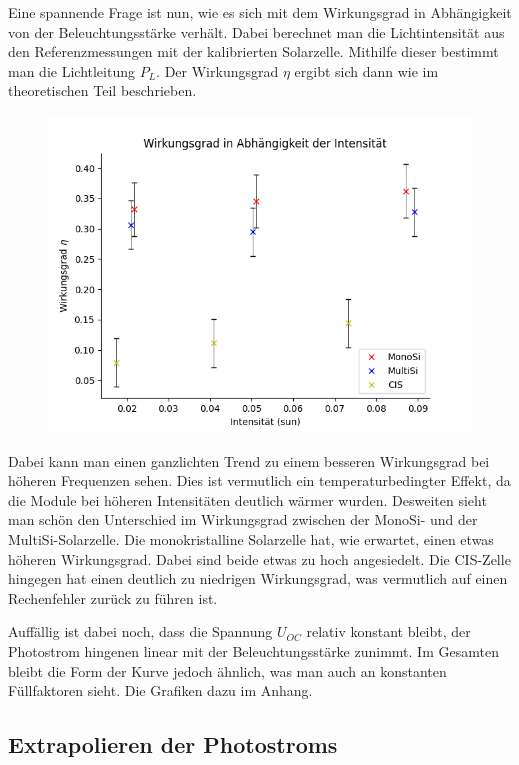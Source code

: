 Eine spannende Frage ist nun, wie es sich mit dem Wirkungsgrad in Abhängigkeit von der Beleuchtungsstärke verhält. 
Dabei berechnet man die Lichtintensität aus den Referenzmessungen mit der kalibrierten Solarzelle. Mithilfe dieser 
bestimmt man die Lichtleitung $P_L$. Der Wirkungsgrad $\eta$ ergibt sich dann wie im theoretischen Teil beschrieben. 

\begin{figure}[h]
    \centering
    \includegraphics[width = \linewidth]{Bilder/PlotWirkungsgradInt.png}
\end{figure}

Dabei kann man einen ganzlichten Trend zu einem besseren Wirkungsgrad bei höheren Frequenzen sehen. Dies ist vermutlich ein 
temperaturbedingter Effekt, da die Module bei höheren Intensitäten deutlich wärmer wurden. Desweiten sieht man schön den Unterschied 
im Wirkungsgrad zwischen der MonoSi- und der MultiSi-Solarzelle. Die monokristalline Solarzelle hat, wie erwartet, einen etwas höheren 
Wirkungsgrad. Dabei sind beide etwas zu hoch angesiedelt. 
Die CIS-Zelle hingegen hat einen deutlich zu niedrigen Wirkungsgrad, was vermutlich auf einen Rechenfehler zurück zu führen ist.\

Auffällig ist dabei noch, dass die Spannung $U_{OC}$ relativ konstant bleibt, der Photostrom hingenen linear mit der Beleuchtungsstärke zunimmt. 
Im Gesamten bleibt die Form der Kurve jedoch ähnlich, was man auch an konstanten Füllfaktoren sieht. Die Grafiken dazu im Anhang.


\subsection{Extrapolieren der Photostroms}

